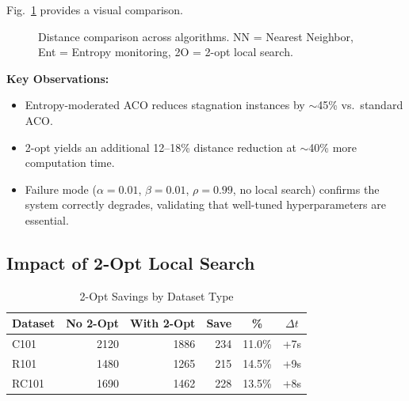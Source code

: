 \documentclass[10pt,conference]{IEEEtran}
\begin{document}
Fig.~\ref{fig:algo_bar} provides a visual comparison.

\begin{figure}[h]
\centering
{}
\caption{Distance comparison across algorithms. NN = Nearest Neighbor, Ent = Entropy monitoring, 2O = 2-opt local search.}
\label{fig:algo_bar}
\end{figure}

\textbf{Key Observations:}
\begin{itemize}
    \item Entropy-moderated ACO reduces stagnation instances by $\sim$45\% vs.\ standard ACO.
    \item 2-opt yields an additional 12--18\% distance reduction at $\sim$40\% more computation time.
    \item Failure mode ($\alpha=0.01$, $\beta=0.01$, $\rho=0.99$, no local search) confirms the system correctly degrades, validating that well-tuned hyperparameters are essential.
\end{itemize}

\subsection{Impact of 2-Opt Local Search}

\begin{table}[h]
\caption{2-Opt Savings by Dataset Type}
\label{tab:2opt_savings}
\begin{center}
\begin{tabular}{|l|r|r|r|c|c|}
\hline
\textbf{Dataset} & \textbf{No 2-Opt} & \textbf{With 2-Opt} & \textbf{Save} & \textbf{\%} & \textbf{$\Delta t$} \\
\hline
C101 & 2120 & 1886 & 234 & 11.0\% & +7s \\
R101 & 1480 & 1265 & 215 & 14.5\% & +9s \\
RC101 & 1690 & 1462 & 228 & 13.5\% & +8s \\
\hline
\end{tabular}
\end{center}
\end{table}
\end{document}
